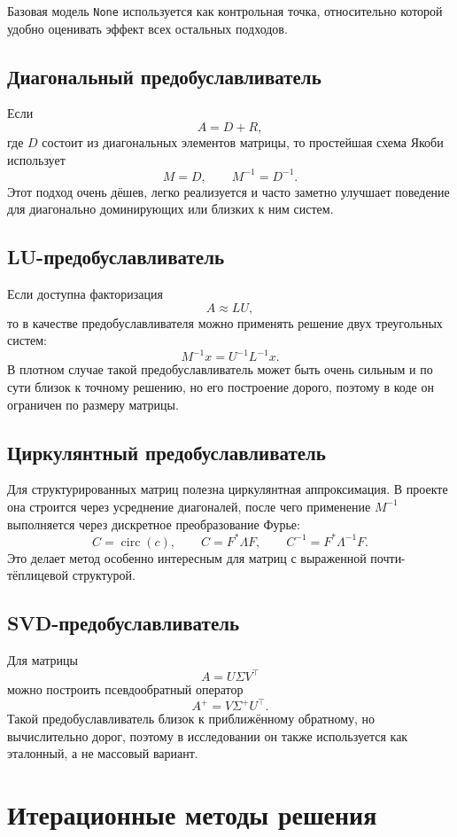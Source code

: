 \documentclass[12pt,a4paper]{article}
\begin{document}
Базовая модель \texttt{None} используется как контрольная точка, относительно которой удобно оценивать эффект всех остальных подходов.

\subsection{Диагональный предобуславливатель}

Если
\[
A = D + R,
\]
где $D$ состоит из диагональных элементов матрицы, то простейшая схема Якоби использует
\[
M=D,
\qquad
M^{-1} = D^{-1}.
\]
Этот подход очень дёшев, легко реализуется и часто заметно улучшает поведение для диагонально доминирующих или близких к ним систем.

\subsection{LU-предобуславливатель}

Если доступна факторизация
\[
A \approx LU,
\]
то в качестве предобуславливателя можно применять решение двух треугольных систем:
\[
M^{-1}x = U^{-1}L^{-1}x.
\]
В плотном случае такой предобуславливатель может быть очень сильным и по сути близок к точному решению, но его построение дорого, поэтому в коде он ограничен по размеру матрицы.

\subsection{Циркулянтный предобуславливатель}

Для структурированных матриц полезна циркулянтная аппроксимация. В проекте она строится через усреднение диагоналей, после чего применение $M^{-1}$ выполняется через дискретное преобразование Фурье:
\[
C = \operatorname{circ}(c), \qquad
C = F^\ast \Lambda F, \qquad
C^{-1} = F^\ast \Lambda^{-1} F.
\]
Это делает метод особенно интересным для матриц с выраженной почти-тёплицевой структурой.

\subsection{SVD-предобуславливатель}

Для матрицы
\[
A = U\Sigma V^\top
\]
можно построить псевдообратный оператор
\[
A^+ = V\Sigma^+ U^\top.
\]
Такой предобуславливатель близок к приближённому обратному, но вычислительно дорог, поэтому в исследовании он также используется как эталонный, а не массовый вариант.

\section{Итерационные методы решения}
\end{document}
